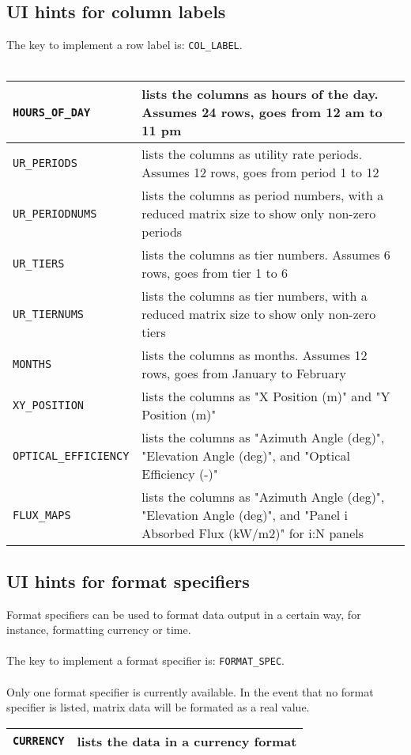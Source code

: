 \documentclass[11pt]{article} %
\begin{document}
\subsection{UI hints for column labels}
The key to implement a row label is: \texttt{COL\_LABEL}.\\
\\
\begin{tabular}{l | p{12cm}}
\hline 
\texttt{HOURS\_OF\_DAY} & lists the columns as hours of the day.  Assumes 24 rows, goes from 12 am to 11 pm \\ \hline
\texttt{UR\_PERIODS} & lists the columns as utility rate periods.  Assumes 12 rows, goes from period 1 to 12 \\ \hline
\texttt{UR\_PERIODNUMS} & lists the columns as period numbers, with a reduced matrix size to show only non-zero periods \\ \hline
\texttt{UR\_TIERS} & lists the columns as tier numbers.  Assumes 6 rows, goes from tier 1 to 6 \\ \hline
\texttt{UR\_TIERNUMS} & lists the columns as tier numbers, with a reduced matrix size to show only non-zero tiers \\ \hline
\texttt{MONTHS} & lists the columns as months.  Assumes 12 rows, goes from January to February \\ \hline
\texttt{XY\_POSITION} & lists the columns as "X Position (m)" and "Y Position (m)" \\ \hline
\texttt{OPTICAL\_EFFICIENCY} & lists the columns as "Azimuth Angle (deg)", "Elevation Angle (deg)", and "Optical Efficiency (-)"\\ \hline
\texttt{FLUX\_MAPS} & lists the columns as "Azimuth Angle (deg)", "Elevation Angle (deg)", and "Panel i Absorbed Flux (kW/m2)" for i:N panels \\ \hline
\end{tabular} 
\subsection{UI hints for format specifiers}
Format specifiers can be used to format data output in a certain way, for instance, formatting currency or time.  \\
\\
The key to implement a format specifier is: \texttt{FORMAT\_SPEC}.\\
\\
Only one format specifier is currently available.  In the event that no format specifier is listed, matrix data will be formated as a real value. \\
\begin{tabular}{l | p{12cm}}
\hline 
\texttt{CURRENCY} & lists the data in a currency format \\ \hline
\end{tabular}
\end{document}
